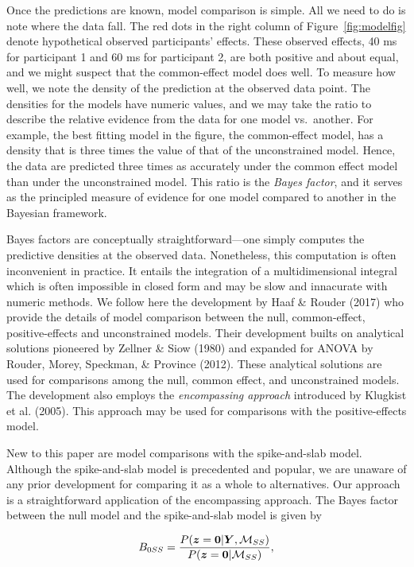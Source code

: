 \documentclass[english,man]{apa6}
\theoremstyle{definition}
\theoremstyle{definition}
\theoremstyle{remark}
\begin{document}
Once the predictions are known, model comparison is simple. All we need
to do is note where the data fall. The red dots in the right column of
Figure~\ref{fig:modelfig} denote hypothetical observed participants'
effects. These observed effects, 40 ms for participant 1 and 60 ms for
participant 2, are both positive and about equal, and we might suspect
that the common-effect model does well. To measure how well, we note the
density of the prediction at the observed data point. The densities for
the models have numeric values, and we may take the ratio to describe
the relative evidence from the data for one model vs.~another. For
example, the best fitting model in the figure, the common-effect model,
has a density that is three times the value of that of the unconstrained
model. Hence, the data are predicted three times as accurately under the
common effect model than under the unconstrained model. This ratio is
the \emph{Bayes factor}, and it serves as the principled measure of
evidence for one model compared to another in the Bayesian framework.

Bayes factors are conceptually straightforward---one simply computes the
predictive densities at the observed data. Nonetheless, this computation
is often inconvenient in practice. It entails the integration of a
multidimensional integral which is often impossible in closed form and
may be slow and innacurate with numeric methods. We follow here the
development by Haaf \& Rouder (2017) who provide the details of model
comparison between the null, common-effect, positive-effects and
unconstrained models. Their development builts on analytical solutions
pioneered by Zellner \& Siow (1980) and expanded for ANOVA by Rouder,
Morey, Speckman, \& Province (2012). These analytical solutions are used
for comparisons among the null, common effect, and unconstrained models.
The development also employs the \emph{encompassing approach} introduced
by Klugkist et al. (2005). This approach may be used for comparisons
with the positive-effects model.

New to this paper are model comparisons with the spike-and-slab model.
Although the spike-and-slab model is precedented and popular, we are
unaware of any prior development for comparing it as a whole to
alternatives. Our approach is a straightforward application of the
encompassing approach. The Bayes factor between the null model and the
spike-and-slab model is given by

\[
B_{0 SS} = \frac{P(\bm{z} = \bm{0}|\bm Y,{\cal M}_{SS})}{P(\bm{z} = \bm{0}|{\cal M}_{SS})},
\]
\end{document}
